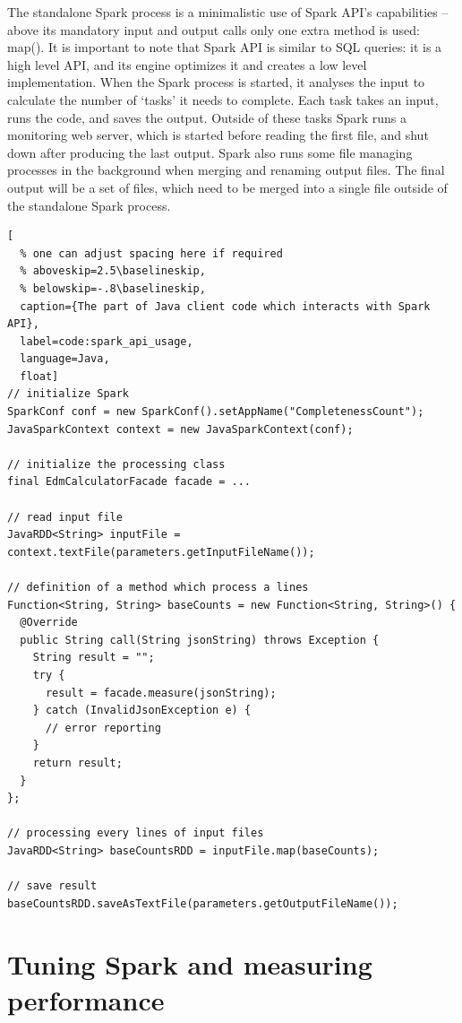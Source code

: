 The standalone Spark process is a minimalistic use of Spark API's capabilities -- above its mandatory input and output calls only one extra method is used: map(). It is important to note that Spark API is similar to SQL queries: it is a high level API, and its engine optimizes it and creates a low level implementation. When the Spark process is started, it analyses the input to calculate the number of `tasks' it needs to complete. Each task takes an input, runs the code, and saves the output. Outside of these tasks Spark runs a monitoring web server, which is started before reading the first file, and shut down after producing the last output. Spark also runs some file managing processes in the background when merging and renaming output files. The final output will be a set of files, which need to be merged into a single file outside of the standalone Spark process.

\begin{lstlisting}[
  % one can adjust spacing here if required
  % aboveskip=2.5\baselineskip,
  % belowskip=-.8\baselineskip,
  caption={The part of Java client code which interacts with Spark API},
  label=code:spark_api_usage,
  language=Java,
  float]
// initialize Spark
SparkConf conf = new SparkConf().setAppName("CompletenessCount");
JavaSparkContext context = new JavaSparkContext(conf);

// initialize the processing class
final EdmCalculatorFacade facade = ... 

// read input file
JavaRDD<String> inputFile = context.textFile(parameters.getInputFileName());

// definition of a method which process a lines
Function<String, String> baseCounts = new Function<String, String>() {
  @Override
  public String call(String jsonString) throws Exception {
    String result = "";
    try {
      result = facade.measure(jsonString);
    } catch (InvalidJsonException e) {
      // error reporting
    }
    return result;
  }
};

// processing every lines of input files
JavaRDD<String> baseCountsRDD = inputFile.map(baseCounts);

// save result
baseCountsRDD.saveAsTextFile(parameters.getOutputFileName());
\end{lstlisting}

\section{Tuning Spark and measuring performance}

